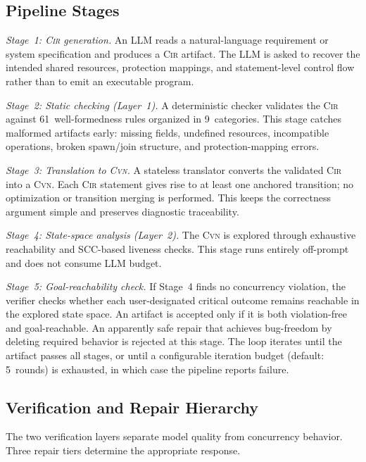 \documentclass[sigconf]{acmart}
\begin{document}
\subsection{Pipeline Stages}
\label{subsec:pipeline-overview}

\emph{Stage~1: \textsc{Cir} generation.}
An LLM reads a natural-language requirement or system specification and produces a \textsc{Cir} artifact. The LLM is asked to recover the intended shared resources, protection mappings, and statement-level control flow rather than to emit an executable program.

\emph{Stage~2: Static checking (Layer~1).}
A deterministic checker validates the \textsc{Cir} against 61~well-formedness rules organized in 9~categories. This stage catches malformed artifacts early: missing fields, undefined resources, incompatible operations, broken spawn/join structure, and protection-mapping errors.

\emph{Stage~3: Translation to \textsc{Cvn}.}
A stateless translator converts the validated \textsc{Cir} into a \textsc{Cvn}. Each \textsc{Cir} statement gives rise to at least one anchored transition; no optimization or transition merging is performed. This keeps the correctness argument simple and preserves diagnostic traceability.

\emph{Stage~4: State-space analysis (Layer~2).}
The \textsc{Cvn} is explored through exhaustive reachability and SCC-based liveness checks. This stage runs entirely off-prompt and does not consume LLM budget.

\emph{Stage~5: Goal-reachability check.}
If Stage~4 finds no concurrency violation, the verifier checks whether each user-designated critical outcome remains reachable in the explored state space. An artifact is accepted only if it is both violation-free and goal-reachable. An apparently safe repair that achieves bug-freedom by deleting required behavior is rejected at this stage. The loop iterates until the artifact passes all stages, or until a configurable iteration budget (default: 5~rounds) is exhausted, in which case the pipeline reports failure.

\subsection{Verification and Repair Hierarchy}
\label{subsec:repair-tier} 
The two verification layers separate model quality from concurrency behavior. Three repair tiers determine the appropriate response.
\end{document}
